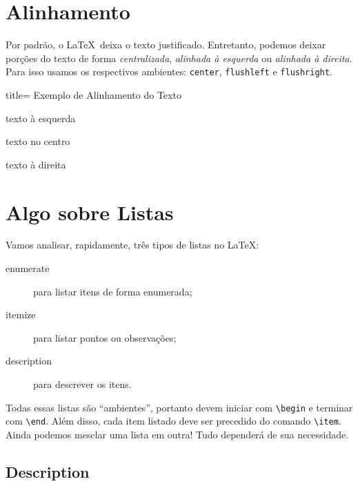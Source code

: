 %
  \section{Alinhamento} %
  \label{sec:alinhamento}
%

Por padrão, o \LaTeX\ deixa o texto \textsf{justificado}.
Entretanto, podemos deixar porções do texto de forma \textit{centralizada}, 
\textit{alinhada à esquerda} ou \textit{alinhada à direita}.
Para isso usamos os respectivos ambientes: \texttt{center}, \texttt{flushleft} e
\texttt{flushright}.

\medskip

\begin{tcblisting}{title= Exemplo de Alinhamento do Texto}
\begin{flushleft}
  texto à esquerda
\end{flushleft}
\begin{center}
  texto no centro
\end{center}
\begin{flushright}
  texto à direita
\end{flushright}  
\end{tcblisting}

%
  \section{Algo sobre Listas} %
  \label{sec:listas}
%

Vamos analisar, rapidamente, três tipos de listas no \LaTeX:

\begin{description}
	\item[enumerate] para listar itens de forma enumerada;
	\item[itemize] para listar pontos ou observações;
	\item[description] para descrever os itens.
\end{description}

Todas essas listas são ``ambientes'', portanto devem iniciar com 
\texttt{\textbackslash begin} e terminar com \texttt{\textbackslash end}.
Além disso, cada item listado deve ser precedido do comando \Verb|\item|.
Ainda podemos mesclar uma lista em outra!
Tudo dependerá de sua necessidade.

%
  \subsection{Description}
%

